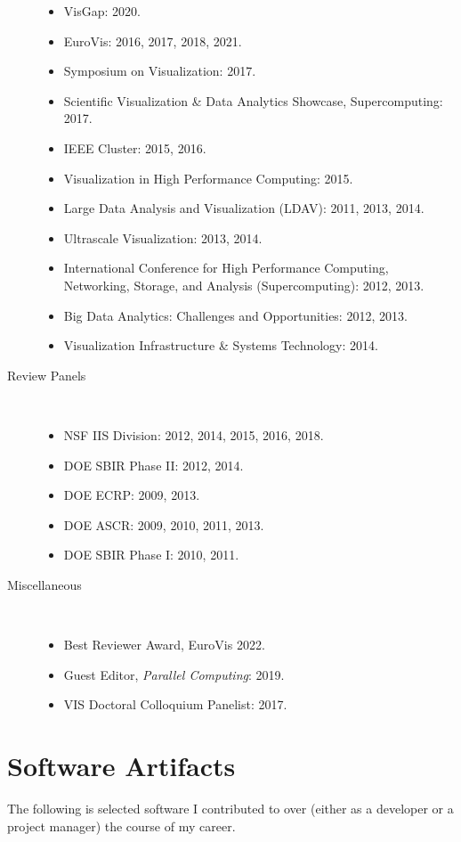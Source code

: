 \documentclass{article}
\begin{document}
\begin{description}
\begin{itemize}
  \item
    VisGap: 2020.
  \item
    EuroVis: 2016, 2017, 2018, 2021.
  \item
    Symposium on Visualization: 2017.
  \item
    Scientific Visualization \& Data Analytics Showcase, Supercomputing: 2017.
  \item
    IEEE Cluster: 2015, 2016.
  \item
    Visualization in High Performance Computing: 2015.
  \item
    Large Data Analysis and Visualization (LDAV): 2011, 2013, 2014.
  \item
    Ultrascale Visualization: 2013, 2014.
  \item
    International Conference for High Performance Computing, Networking, Storage, and Analysis (Supercomputing): 2012, 2013.
  \item
    Big Data Analytics: Challenges and Opportunities: 2012, 2013.
  \item
    Visualization Infrastructure \& Systems Technology: 2014.
  \end{itemize}
\item[Review Panels]~
  \begin{itemize}
  \item
    NSF IIS Division: 2012, 2014, 2015, 2016, 2018.
  \item
    DOE SBIR Phase II: 2012, 2014.
  \item
    DOE ECRP: 2009, 2013.
  \item
    DOE ASCR: 2009, 2010, 2011, 2013.
  \item
    DOE SBIR Phase I: 2010, 2011.
  \end{itemize}
\item[Miscellaneous]~
  \begin{itemize}
  \item
    Best Reviewer Award, EuroVis 2022.
  \item
    Guest Editor, \emph{Parallel Computing}: 2019.
  \item
    VIS Doctoral Colloquium Panelist: 2017.
  \end{itemize}
\end{description}

\section*{Software Artifacts}

The following is selected software I contributed to over (either as a developer or a project manager) the course of my career.
\end{document}
